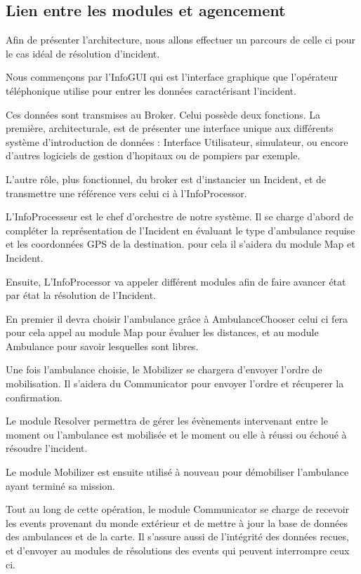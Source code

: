\subsection{Lien entre les modules et agencement}
	Afin de présenter l'architecture, nous allons effectuer
	un parcours de celle ci pour le cas idéal de résolution
	d'incident.

	Nous commençons par l'InfoGUI qui est l'interface graphique que
	l'opérateur téléphonique utilise pour entrer les données
	caractérisant l'incident.

	Ces données sont transmises au Broker. Celui possède deux
	fonctions. La première, architecturale, est de présenter
	une interface unique aux différents système d'introduction
	de données : Interface Utilisateur, simulateur, ou encore 
	d'autres logiciels de gestion d'hopitaux ou de pompiers par
	exemple.
	
	L'autre rôle, plus fonctionnel, du broker est d'instancier
	un Incident, et de transmettre
	une référence vers celui ci à l'InfoProcessor.

	L'InfoProcesseur est le chef d'orchestre de notre système.
	Il se charge d'abord de compléter la représentation de
	l'Incident en évaluant le type d'ambulance requise
	et les coordonnées GPS de la destination. pour cela
	il s'aidera du module Map et Incident.

	Ensuite, L'InfoProcessor va appeler différent modules
	afin de faire avancer état par état la résolution de
	l'Incident. 

	En premier il devra choisir l'ambulance grâce à AmbulanceChooser
	celui ci fera pour cela appel au module Map pour
	évaluer les distances, et au module Ambulance pour savoir
	lesquelles sont libres. 

	Une fois l'ambulance choisie, le Mobilizer se chargera d'envoyer
	l'ordre de mobilisation. Il s'aidera du Communicator pour 
	envoyer l'ordre et récuperer la confirmation. 

	Le module Resolver permettra de gérer les évènements intervenant
	entre le moment ou l'ambulance est mobilisée et le moment
	ou elle à réussi ou échoué à résoudre l'incident.

	Le module Mobilizer est ensuite utilisé à nouveau pour démobiliser
	l'ambulance ayant terminé sa mission. 

	Tout au long de cette opération, le module Communicator se
	charge de recevoir les events provenant du monde extérieur
	et de mettre à jour la base de données des ambulances et de
	la carte. Il s'assure aussi de l'intégrité des données recues,
	et d'envoyer au modules de résolutions des events qui 
	peuvent interrompre ceux ci.

